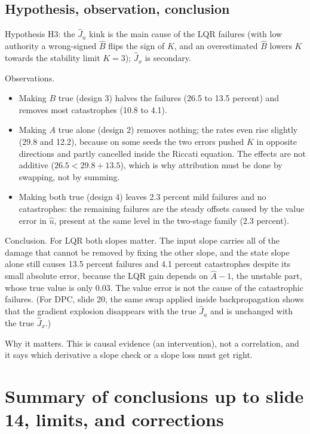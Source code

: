 \documentclass[11pt]{article}
\begin{document}
\subsection{Hypothesis, observation, conclusion}
Hypothesis H3: the $\hat J_u$ kink is the main cause of the LQR failures (with low authority a wrong-signed $\hat B$ flips the sign of $K$, and an overestimated $\hat B$ lowers $K$ towards the stability limit $K=3$); $\hat J_x$ is secondary.

Observations.
\begin{itemize}
\item Making $B$ true (design 3) halves the failures (26.5 to 13.5 percent) and removes most catastrophes (10.8 to 4.1).
\item Making $A$ true alone (design 2) removes nothing; the rates even rise slightly (29.8 and 12.2), because on some seeds the two errors pushed $K$ in opposite directions and partly cancelled inside the Riccati equation. The effects are not additive ($26.5<29.8+13.5$), which is why attribution must be done by swapping, not by summing.
\item Making both true (design 4) leaves 2.3 percent mild failures and no catastrophes: the remaining failures are the steady offsets caused by the value error in $\hat u$, present at the same level in the two-stage family (2.3 percent).
\end{itemize}
Conclusion. For LQR both slopes matter. The input slope carries all of the damage that cannot be removed by fixing the other slope, and the state slope alone still causes 13.5 percent failures and 4.1 percent catastrophes despite its small absolute error, because the LQR gain depends on $\hat A-1$, the unstable part, whose true value is only 0.03. The value error is not the cause of the catastrophic failures. (For DPC, slide 20, the same swap applied inside backpropagation shows that the gradient explosion disappears with the true $\hat J_u$ and is unchanged with the true $\hat J_x$.)

Why it matters. This is causal evidence (an intervention), not a correlation, and it says which derivative a slope check or a slope loss must get right.

\section{Summary of conclusions up to slide 14, limits, and corrections}\label{sec:summary}
\end{document}
